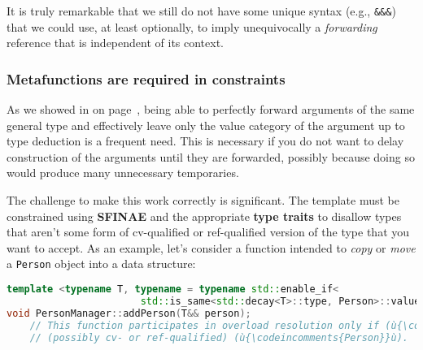 \noindent It is truly remarkable that we still do not have some unique syntax
(e.g., \texttt{\&\&\&}) that we could use, at least optionally, to imply
unequivocally a \emph{forwarding} reference that is independent of its
context.

\subsubsection[Metafunctions are required in constraints]{Metafunctions are required in constraints}\label{metafunctions-are-required-in-constraints}

As we showed in \textit{} on page~\pageref{use-cases-forwardingref}, being able to
perfectly forward arguments of the same general type and effectively
leave only the value category of the argument up to type deduction is a frequent need. This
is necessary if you do not want to delay construction of the arguments
until they are forwarded, possibly because doing so would produce many
unnecessary temporaries.

The challenge to make this work correctly is significant. The template
must be constrained using \textbf{SFINAE} and the appropriate
\textbf{type traits} to disallow types that aren't some form of
cv-qualified or ref-qualified version of the type that you want to
accept. As an example, let's consider a function intended to \emph{copy}
or \emph{move} a \texttt{Person} object into a data structure:

\begin{lstlisting}[language=C++]
template <typename T, typename = typename std::enable_if<
                       std::is_same<std::decay<T>::type, Person>::value>::type>
void PersonManager::addPerson(T&& person);
    // This function participates in overload resolution only if (ù{\codeincomments{T}}ù) is
    // (possibly cv- or ref-qualified) (ù{\codeincomments{Person}}ù).
\end{lstlisting}


